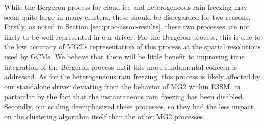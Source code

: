 \documentclass [11pt, proquest] {uwthesis}[2020/02/24]
\begin{document}
While the Bergeron process for cloud ice and heterogeneous rain freezing may seem quite large in many clusters, these should be disregarded for two reasons. Firstly, as noted in Section \ref{sec:proc-assoc-results}, these two processes are not likely to be well represented in our driver. For the Bergeron process, this is due to the low accuracy of MG2's representation of this process at the spatial resolutions used by GCMs. We believe that there will be little benefit to improving time integration of the Bergeron process until this more fundamental concern is addressed. As for the heterogeneous rain freezing, this process is likely affected by our standalone driver deviating from the behavior of MG2 within E3SM, in particular by the fact that the instantaneous rain freezing has been disabled. Secondly, our scaling deemphasized these processes, so they had the less impact on the clustering algorithm itself than the other MG2 processes.
\end{document}
